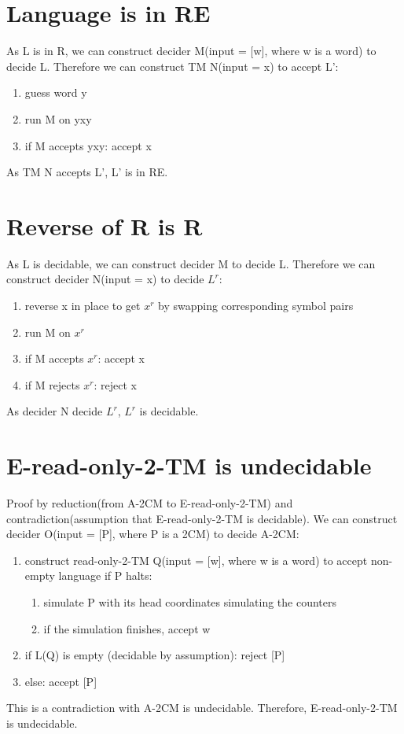 \documentclass{article}
\begin{document}
\section{Language is in RE}
As L is in R, we can construct decider M(input = [w], where w is a word) to decide L. Therefore we can construct TM N(input = x) to accept L':
\begin{enumerate}
	\item guess word y
	\item run M on yxy
	\item if M accepts yxy: accept x
\end{enumerate}
As TM N accepts L', L' is in RE.

\section{Reverse of R is R}
As L is decidable, we can construct decider M to decide L. Therefore we can construct decider N(input = x) to decide $ L^r $:
\begin{enumerate}
	\item reverse x in place to get $ x^r $ by swapping corresponding symbol pairs
	\item run M on $ x^r $
	\item if M accepts $ x^r $: accept x
	\item if M rejects $ x^r $: reject x
\end{enumerate}
As decider N decide $ L^r $, $ L^r $ is decidable.

\section{E-read-only-2-TM is undecidable}
Proof by reduction(from A-2CM to E-read-only-2-TM) and contradiction(assumption 
that E-read-only-2-TM is decidable).
We can construct decider O(input = [P], where P is a 2CM) to decide A-2CM:
\begin{enumerate}
	\item construct read-only-2-TM Q(input = [w], where w is a word) to accept 
	non-empty language if P halts:
	\begin{enumerate}
		\item simulate P with its head coordinates simulating the counters
		\item if the simulation finishes, accept w
	\end{enumerate}
	\item if L(Q) is empty (decidable by assumption): reject [P]
	\item else: accept [P]
\end{enumerate}
This is a contradiction with A-2CM is undecidable. Therefore, E-read-only-2-TM is undecidable.
\end{document}
